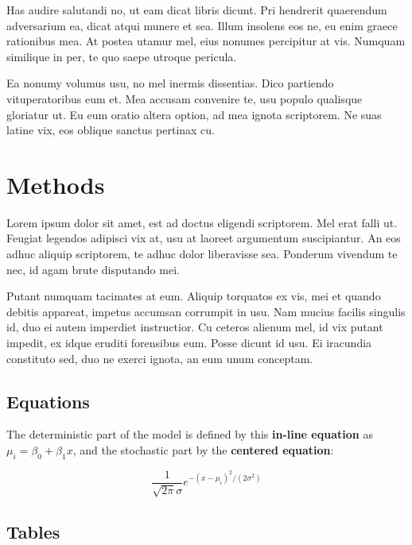 \documentclass[]{article}
\begin{document}
Has audire salutandi no, ut eam dicat libris dicunt. Pri hendrerit
quaerendum adversarium ea, dicat atqui munere et sea. Illum insolens eos
ne, eu enim graece rationibus mea. At postea utamur mel, eius nonumes
percipitur at vis. Numquam similique in per, te quo saepe utroque
pericula.

Ea nonumy volumus usu, no mel inermis dissentias. Dico partiendo
vituperatoribus eum et. Mea accusam convenire te, usu populo qualisque
gloriatur ut. Eu eum oratio altera option, ad mea ignota scriptorem. Ne
suas latine vix, eos oblique sanctus pertinax cu.

\section{Methods}\label{methods}

Lorem ipsum dolor sit amet, est ad doctus eligendi scriptorem. Mel erat
falli ut. Feugiat legendos adipisci vix at, usu at laoreet argumentum
suscipiantur. An eos adhuc aliquip scriptorem, te adhuc dolor
liberavisse sea. Ponderum vivendum te nec, id agam brute disputando mei.

Putant numquam tacimates at eum. Aliquip torquatos ex vis, mei et quando
debitis appareat, impetus accumsan corrumpit in usu. Nam mucius facilis
singulis id, duo ei autem imperdiet instructior. Cu ceteros alienum mel,
id vix putant impedit, ex idque eruditi forensibus eum. Posse dicunt id
usu. Ei iracundia constituto sed, duo ne exerci ignota, an eum unum
conceptam.

\subsection{Equations}\label{equations}

The deterministic part of the model is defined by this \textbf{in-line
equation} as \(\mu_i = \beta_0 + \beta_1x\), and the stochastic part by
the \textbf{centered equation}:

\[ \frac{1}{\sqrt{2\pi}\sigma}e^{-(x-\mu_i)^2/(2\sigma^2)} \]

\subsection{Tables}\label{tables}
\end{document}
